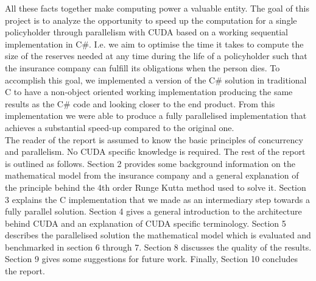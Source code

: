 All these facts together make computing power a valuable entity. The goal of this project is to analyze the opportunity to speed up the computation for a single policyholder through parallelism with CUDA based on a working sequential implementation in C\#. I.e. we aim to optimise the time it takes to compute the size of the reserves needed at any time during the life of a policyholder such that the insurance company can fulfill its obligations when the person dies. To accomplish this goal, we implemented a version of the C\# solution in traditional C to have a non-object oriented working implementation producing the same results as the C\# code and looking closer to the end product. From this implementation we were able to produce a fully parallelised implementation that achieves a substantial speed-up compared to the original one.\\

The reader of the report is assumed to know the basic principles of concurrency and parallelism. No CUDA specific knowledge is required. The rest of the report is outlined as follows. Section 2 provides some background information on the mathematical model from the insurance company and a general explanation of the principle behind the 4th order Runge Kutta method used to solve it. Section 3 explains the C implementation that we made as an intermediary step towards a fully parallel solution. Section 4 gives a general introduction to the architecture behind CUDA and an explanation of CUDA specific terminology. Section 5 describes the parallelised solution the mathematical model which is evaluated and benchmarked in section 6 through 7. Section 8 discusses the quality of the results. Section 9 gives some suggestions for future work. Finally, Section 10 concludes the report.